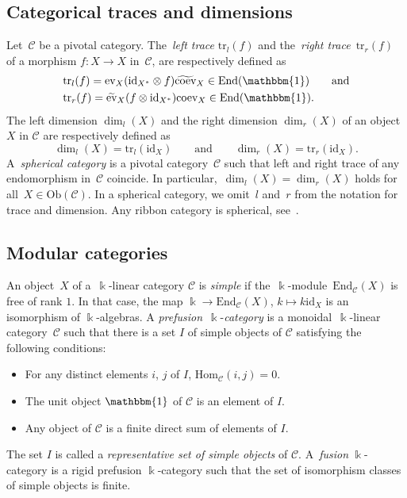 \documentclass[10pt,a4paper]{amsart}
\numberwithin{equation}{section}
\newcommand{\co}{\colon}
\newcommand{\tens}{\otimes}
\newcommand{\id}{\mathrm{id}}
\newcommand{\ltr}[1]{\text{tr}_l(#1)}
\newcommand{\rtr}[1]{\text{tr}_r(#1)}
\newcommand{\mc}{\mathcal}
\newcommand{\Hom}{\mathrm{Hom}}
\newcommand{\End}{\text{End}}
\newcommand{\Ob}[1]{\mathrm{Ob}(#1)}
\newcommand{\kk}{\Bbbk}
\newcommand{\uu}{\mathbbm{1}}
\newcommand{\evl}{\text{ev}}
\newcommand{\evr}{\widetilde{\text{ev}}}
\newcommand{\coevl}{\text{coev}}
\newcommand{\coevr}{\widetilde{\text{coev}}}
\begin{document}
\subsection{Categorical traces and dimensions} %
Let~$\mc C$ be a pivotal category.
The~\textit{left trace} $\ltr{f}$ and the~\textit{right trace}~$\rtr{f}$ of a morphism $f\co X \to X$ in~$\mc C$, are respectively defined as
\begin{align*}
&\ltr{f}=\evl_{X}(\id_{X^*}\tens f)\coevr_X \in \End(\uu) \qquad \text{and} \\
&\rtr{f}=\evr_{X}(f\tens \id_{X^*})\coevl_X \in \End(\uu).
\end{align*}
The left dimension $\dim_l(X)$ and the right dimension $\dim_r(X)$ of an object $X$ in $\mc C$ are respectively defined as
\[\dim_l(X)=\ltr{\id_X} \qquad \text{and} \qquad \dim_r(X)=\rtr{\id_X}.\]
A~\textit{spherical category} is a pivotal category~$\mc C$ such that left and right trace of any endomorphism in~$\mc C$ coincide. In particular,~$\dim_l(X)=\dim_r(X)$ holds for all~$X \in\Ob{\mc C}$. In a spherical category, we omit~$l$ and~$r$ from the notation for trace and dimension. Any ribbon category is spherical, see~\cite[Corollary 3.4]{moncatstft}.

\subsection{Modular categories} \label{modular} An object~$X$ of a~$\kk$-linear category $\mc C$ is \textit{simple} if the~$\kk$-module~$\End_{\mc C}(X)$ is free of rank $1$. In that case, the map $\kk \to \End_{\mc C}(X)$, $k\mapsto k\id_X$ is an isomorphism of $\kk$-algebras. A \textit{prefusion}~$\kk$-\textit{category} is a monoidal~$\kk$-linear category~$\mc C$ such that there is a set $I$ of simple objects of $\mc C$ satisfying the following conditions:
\begin{itemize}\itemsep=0pt
	\item[$(a)$] For any distinct elements $i$, $j$ of $I$, $\Hom_{\mc C}(i,j)=0$.
	\item[$(b)$] The unit object $\uu$ of $\mc C$ is an element of $I$.
	\item[$(c)$] Any object of $\mc C$ is a finite direct sum of elements of $I$.
\end{itemize}
The set $I$ is called a \textit{representative set of simple objects} of $\mc C$.
A~\textit{fusion} $\kk$-category is a rigid prefusion $\kk$-category such that the set of isomorphism classes of simple objects is finite.
\end{document}
